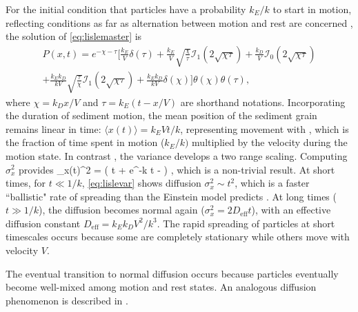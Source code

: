 For the initial condition that particles have a probability $k_E/k$ to start in motion, reflecting \DIFdelbegin {}\DIFdelend \DIFaddbegin {}\DIFaddend conditions as far as alternation between motion and rest are concerned \citep[e.g.][]{Ancey2006}, the solution of \DIFdelbegin {}\DIFdelend \DIFaddbegin {}\DIFaddend \ref{eq:lislemaster} is \citep{Lisle1998}
\begin{multline}  P(x,t) =  e^{-\chi-\tau} \Big[ \frac{k_E}{V}\delta(\tau) + \frac{k_E}{V} \sqrt{\frac{\chi}{\tau}}\mathcal{I}_1(2\sqrt{\chi\tau}) + \frac{k_D}{V}\mathcal{I}_0(2\sqrt{\chi\tau}) \\
	+ \frac{k_Ek_D}{kV}\sqrt{\frac{\tau}{\chi}}\mathcal{I}_1(2\sqrt{\chi\tau}) + \frac{k_Ek_D}{kV} \delta(\chi)
	\Big]\theta(\chi)\theta(\tau), \label{eq:lisledist}
\end{multline}
where $\chi = k_D x/V$ and $\tau = k_E(t-x/V)$ are shorthand notations.
Incorporating the duration of sediment motion, the mean position of the sediment grain remains linear in time: $\langle x (t) \rangle  = k_E V t/k$, representing movement with \DIFdelbegin {}\DIFdelend \DIFaddbegin {}\DIFaddend , which is the fraction of time spent in motion ($k_E/k)$ \citep{Ancey2006} multiplied by the velocity during the motion state. In contrast \DIFaddbegin {}\DIFaddend , the variance \DIFaddbegin {}\DIFaddend develops a two range scaling.
Computing $\sigma_x^2$ provides
\be \sigma_x(t)^2 = \Big( t + e^{-k t} - \Big) , \label{eq:lislevar}\ee
which is a non-trivial result. At short times, for $t\ll 1/k$, \DIFdelbegin {}\DIFdelend \DIFaddbegin {}\DIFaddend \ref{eq:lislevar} shows diffusion $\sigma_x^2 \sim t^2$, which is a faster ``ballistic" rate of spreading than the Einstein model predicts \citep{Sokolov2012}. At long times ($t\gg 1/k$), the diffusion becomes normal again ($\sigma_x^2 = 2 D_\text{eff} t$), with an effective diffusion constant $ D_\text{eff} = k_E k_D V^2/k^3$. 
The rapid spreading of particles at short timescales occurs because some are completely stationary while others move with velocity $V$.

The eventual transition to normal diffusion occurs because particles eventually become well-mixed among motion and rest states. An analogous diffusion phenomenon is described in \citet{Taylor1920}.

